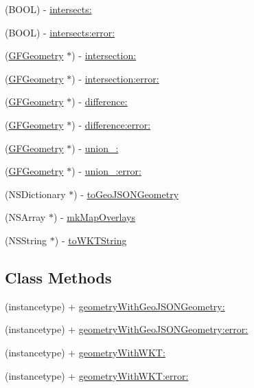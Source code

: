 \begin{DoxyCompactItemize}
(B\+O\+O\+L) -\/ \hyperlink{interface_g_f_geometry_a86d1a80435c6b838dfb8b1a22a17a0b8}{intersects\+:}
\item 
(B\+O\+O\+L) -\/ \hyperlink{interface_g_f_geometry_a836e4a35ecadb3a35c4f0bd8fb3a6740}{intersects\+:error\+:}
\item 
(\hyperlink{interface_g_f_geometry}{G\+F\+Geometry} $\ast$) -\/ \hyperlink{interface_g_f_geometry_ac93053aeabad1f97466b1ec31292ed11}{intersection\+:}
\item 
(\hyperlink{interface_g_f_geometry}{G\+F\+Geometry} $\ast$) -\/ \hyperlink{interface_g_f_geometry_a3b071da06cde8e37681d8dec934ca62d}{intersection\+:error\+:}
\item 
(\hyperlink{interface_g_f_geometry}{G\+F\+Geometry} $\ast$) -\/ \hyperlink{interface_g_f_geometry_acb76057cb6cdee9255ecba8447045cc6}{difference\+:}
\item 
(\hyperlink{interface_g_f_geometry}{G\+F\+Geometry} $\ast$) -\/ \hyperlink{interface_g_f_geometry_ad84c62d6fee6b0169128bae069e84f53}{difference\+:error\+:}
\item 
(\hyperlink{interface_g_f_geometry}{G\+F\+Geometry} $\ast$) -\/ \hyperlink{interface_g_f_geometry_a58c32fcf4a3932281498d1a1b25fb46b}{union\+\_\+\+:}
\item 
(\hyperlink{interface_g_f_geometry}{G\+F\+Geometry} $\ast$) -\/ \hyperlink{interface_g_f_geometry_af05f89e6df33df7c59c99b57cf2c35f2}{union\+\_\+\+:error\+:}
\item 
(N\+S\+Dictionary $\ast$) -\/ \hyperlink{interface_g_f_geometry_a89a1dd53c1d9a51fd5b933fde28be5b7}{to\+Geo\+J\+S\+O\+N\+Geometry}
\item 
(N\+S\+Array $\ast$) -\/ \hyperlink{interface_g_f_geometry_a69a56e7786e1de09034c546ade1c7262}{mk\+Map\+Overlays}
\item 
(N\+S\+String $\ast$) -\/ \hyperlink{interface_g_f_geometry_a9d257cce05d031211e2cece24b5530e4}{to\+W\+K\+T\+String}
\end{DoxyCompactItemize}
\subsection*{Class Methods}
\begin{DoxyCompactItemize}
\item 
(instancetype) + \hyperlink{interface_g_f_geometry_a5b730dcea33fc8b2c156199400e3014e}{geometry\+With\+Geo\+J\+S\+O\+N\+Geometry\+:}
\item 
(instancetype) + \hyperlink{interface_g_f_geometry_ac665565535c19e73e6b7a696e8109586}{geometry\+With\+Geo\+J\+S\+O\+N\+Geometry\+:error\+:}
\item 
(instancetype) + \hyperlink{interface_g_f_geometry_a32a49e08fdbc2998735c26ddbfa88741}{geometry\+With\+W\+K\+T\+:}
\item 
(instancetype) + \hyperlink{interface_g_f_geometry_a9517f77b573e92c5f1f76ce63ec53a89}{geometry\+With\+W\+K\+T\+:error\+:}
\end{DoxyCompactItemize}


